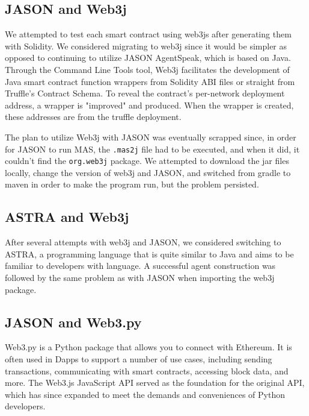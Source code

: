 \subsection{JASON and Web3j}

We attempted to test each smart contract using web3js after generating them with Solidity. We considered migrating to web3j since it would be simpler as opposed to continuing to utilize JASON AgentSpeak, which is based on Java. Through the Command Line Tools tool, Web3j facilitates the development of Java smart contract function wrappers from Solidity ABI files or straight from Truffle's Contract Schema. To reveal the contract's per-network deployment address, a wrapper is "improved" and produced. When the wrapper is created, these addresses are from the truffle deployment.

\vspace{.5cm}

The plan to utilize Web3j with JASON was eventually scrapped since, in order for JASON to run \ac{MAS}, the \texttt{.mas2j} file had to be executed, and when it did, it couldn't find the \texttt{org.web3j} package. We attempted to download the jar files locally, change the version of web3j and JASON, and switched from gradle to maven in order to make the program run, but the problem persisted.

\subsection{ASTRA and Web3j}

After several attempts with web3j and JASON, we considered switching to \ac{ASTRA}, a programming language that is quite similar to Java and aims to be familiar to developers with language. A successful agent construction was followed by the same problem as with JASON when importing the web3j package.

\subsection{JASON and Web3.py}

Web3.py is a Python package that allows you to connect with Ethereum. It is often used in \ac{Dapp}s to support a number of use cases, including sending transactions, communicating with smart contracts, accessing block data, and more. The Web3.js JavaScript \ac{API} served as the foundation for the original \ac{API}, which has since expanded to meet the demands and conveniences of Python developers.


